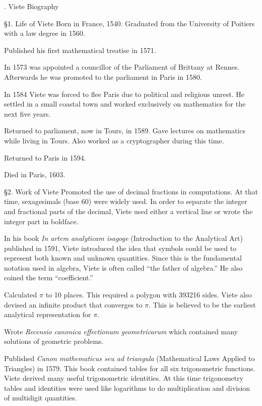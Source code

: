 . Viete Biography

\bigskip
\item{\S1.} Life of Viete
 Born in France, 1540.
Graduated from the University of Poitiers with a
law degree in 1560.

Published his first mathematical treatise in 1571.

In 1573 was appointed a councillor of the
Parliament of Brittany at Rennes. Afterwards he was
promoted to the parliament in Paris in 1580.

In 1584 Viete was forced to flee Paris due to
political and religious unrest.
He settled in a small coastal town and worked
exclusively on mathematics for the next
five years.

Returned to parliament, now in Tours, in 1589.
Gave lectures on mathematics while living in Tours.
Also worked as a cryptographer during this time.

Returned to Paris in 1594.

 Died in Paris, 1603.

\bigskip
\item{\S2.} Work of Viete
Promoted the use of decimal fractions in computations.
At that time, sexagesimals (base 60) were widely used.
In order to separate the integer and fractional parts
of the decimal, Viete used either a vertical line or
wrote the integer part in boldface.

In his book {\it In artem analyticam isagoge}
(Introduction to the Analytical Art) published in 1591,
Viete introduced the idea that symbols could be
used to represent both known and unknown quantities.
Since this is the fundamental notation used in algebra,
Viete is often called ``the
father of algebra.''
He also coined the term ``coefficient.''

Calculated $\pi$ to 10 places.
This required a polygon with 393216 sides.
Viete also devised an infinite product that converges to $\pi$.
This is believed to be the earliest analytical representation
for $\pi$.

Wrote {\it Recensio canonica effectionum geometricarum}
which contained many solutions of geometric problems.

Published {\it  Canon mathematicus seu ad triangula}
(Mathematical Laws Applied to Triangles) in 1579.
This book contained tables for all six trigonometric
functions.
Viete derived many useful trigonometric identities.
At this time trigonometry tables and identities were
used like logarithms to do multiplication and
division of multidigit quantities.

